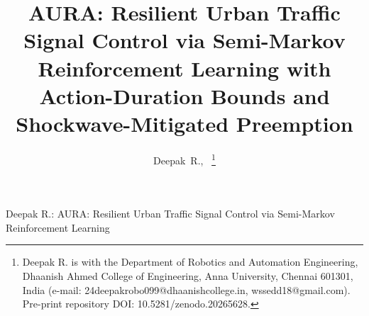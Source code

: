 \documentclass[journal]{IEEEtran}
\begin{document}
\title{AURA: Resilient Urban Traffic Signal Control via Semi-Markov Reinforcement Learning with Action-Duration Bounds and Shockwave-Mitigated Preemption}

\author{Deepak~R.,~%
\thanks{Deepak R. is with the Department of Robotics and Automation Engineering, Dhaanish Ahmed College of Engineering, Anna University, Chennai 601301, India (e-mail: 24deepakrobo099@dhaanishcollege.in, wssedd18@gmail.com). Pre-print repository DOI: 10.5281/zenodo.20265628.}%
}

%
{Deepak R.: AURA: Resilient Urban Traffic Signal Control via Semi-Markov Reinforcement Learning}

\maketitle
\end{document}
